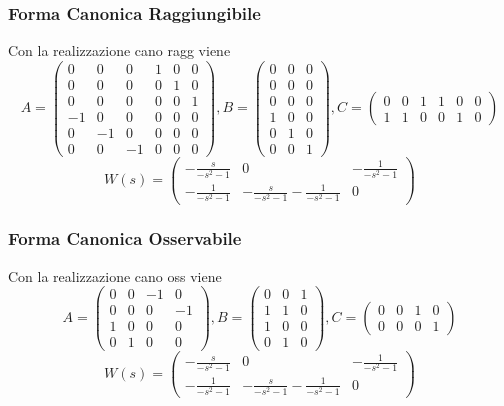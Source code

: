 \documentclass{article}
\begin{document}
\subsubsection{Forma Canonica Raggiungibile}
Con la realizzazione cano ragg viene \[ A = \left(\begin{matrix}0 & 0 & 0 & 1 & 0 & 0\\0 & 0 & 0 & 0 & 1 & 0\\0 & 0 & 0 & 0 & 0 & 1\\-1 & 0 & 0 & 0 & 0 & 0\\0 & -1 & 0 & 0 & 0 & 0\\0 & 0 & -1 & 0 & 0 & 0\end{matrix}\right), B = \left(\begin{matrix}0 & 0 & 0\\0 & 0 & 0\\0 & 0 & 0\\1 & 0 & 0\\0 & 1 & 0\\0 & 0 & 1\end{matrix}\right), C= \left(\begin{matrix}0 & 0 & 1 & 1 & 0 & 0\\1 & 1 & 0 & 0 & 1 & 0\end{matrix}\right) \]
\[ W(s) = \left(\begin{matrix}- \frac{s}{- s^{2} - 1} & 0 & - \frac{1}{- s^{2} - 1}\\- \frac{1}{- s^{2} - 1} & - \frac{s}{- s^{2} - 1} - \frac{1}{- s^{2} - 1} & 0\end{matrix}\right) 
\]\subsubsection{Forma Canonica Osservabile}
Con la realizzazione cano oss viene \[ A = \left(\begin{matrix}0 & 0 & -1 & 0\\0 & 0 & 0 & -1\\1 & 0 & 0 & 0\\0 & 1 & 0 & 0\end{matrix}\right), B = \left(\begin{matrix}0 & 0 & 1\\1 & 1 & 0\\1 & 0 & 0\\0 & 1 & 0\end{matrix}\right), C= \left(\begin{matrix}0 & 0 & 1 & 0\\0 & 0 & 0 & 1\end{matrix}\right) \]
\[ W(s) = \left(\begin{matrix}- \frac{s}{- s^{2} - 1} & 0 & - \frac{1}{- s^{2} - 1}\\- \frac{1}{- s^{2} - 1} & - \frac{s}{- s^{2} - 1} - \frac{1}{- s^{2} - 1} & 0\end{matrix}\right) 
\]
\end{document}
